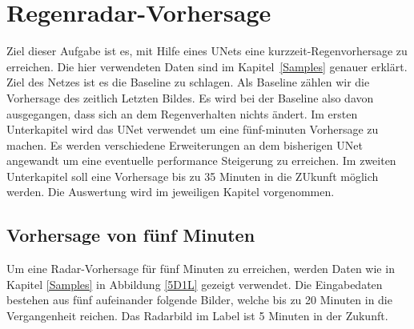 \section{Regenradar-Vorhersage}
Ziel dieser Aufgabe ist es, mit Hilfe eines UNets eine kurzzeit-Regenvorhersage zu erreichen. Die hier verwendeten Daten sind im Kapitel~\ref{Samples} genauer erklärt. Ziel des Netzes ist es die Baseline zu schlagen. Als Baseline zählen wir die Vorhersage des zeitlich Letzten Bildes. Es wird bei der Baseline also davon ausgegangen, dass sich an dem Regenverhalten nichts ändert. Im ersten Unterkapitel wird das UNet verwendet um eine fünf-minuten Vorhersage zu machen. Es werden verschiedene Erweiterungen an dem bisherigen UNet angewandt um eine eventuelle performance Steigerung zu erreichen. Im zweiten Unterkapitel soll eine Vorhersage bis zu 35 Minuten in die ZUkunft möglich werden. Die Auswertung wird im jeweiligen Kapitel vorgenommen.

\subsection{Vorhersage von fünf Minuten}
Um eine Radar-Vorhersage für fünf Minuten zu erreichen, werden Daten wie in Kapitel \ref{Samples} in Abbildung \ref{5D1L} gezeigt verwendet. Die Eingabedaten bestehen aus fünf aufeinander folgende Bilder, welche bis zu 20 Minuten in die Vergangenheit reichen. Das Radarbild im Label ist 5 Minuten in der Zukunft.

